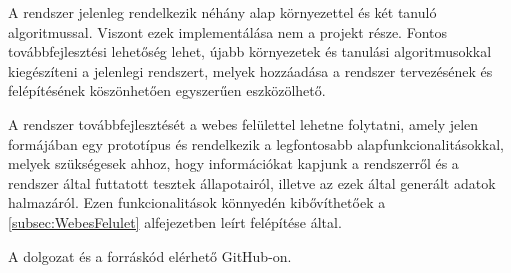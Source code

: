 A rendszer jelenleg rendelkezik néhány alap környezettel és két tanuló algoritmussal. Viszont ezek implementálása nem a projekt része. Fontos továbbfejlesztési lehetőség lehet, újabb környezetek és tanulási algoritmusokkal kiegészíteni a jelenlegi rendszert, melyek hozzáadása a rendszer tervezésének és felépítésének köszönhetően egyszerűen eszközölhető. 

A rendszer továbbfejlesztését a webes felülettel lehetne folytatni, amely jelen formájában egy prototípus és rendelkezik a legfontosabb alapfunkcionalitásokkal, melyek szükségesek ahhoz, hogy információkat kapjunk a rendszerről és a rendszer által futtatott tesztek állapotairól, illetve az ezek által generált adatok halmazáról. Ezen funkcionalitások könnyedén kibővíthetőek a \ref{subsec:WebesFelulet} alfejezetben leírt felépítése által.

A dolgozat\cite{dolgozat} és a forráskód\cite{forras} elérhető GitHub-on. 

